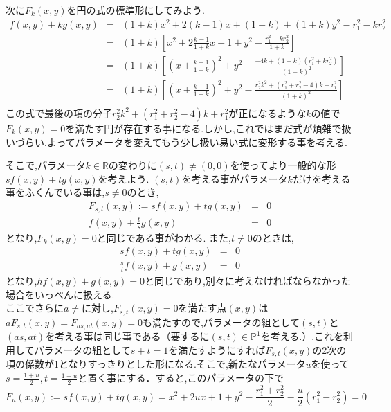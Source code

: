 \documentclass[a4j,12pt]{jarticle}
\numberwithin{equation}{section}
\newcommand{\R}{\mathbb R}
\begin{document}
次に$F_k(x,y)$を円の式の標準形にしてみよう.
\begin{eqnarray}
     f(x,y) + k g(x,y) &=& (1+k)x^2 + 2(k-1) x + (1+k) + (1+k)y^2  - r_1^2  - kr_2^2  \nonumber \\
      &=&  (1+k)\left[ x^2 + 2\frac{k-1}{1+k} x + 1 + y^2  -\frac{ r_1^2  + kr_2^2}{1+k} \right]\nonumber\\
      &=&  (1+k)\left[ \left(x + \frac{k-1}{1+k} \right)^2 + y^2  -\frac{ -4k +(1+k)(r_1^2  + kr_2^2)}{(1+k)^2} \right]\nonumber\\
      &=&  (1+k)\left[ \left(x + \frac{k-1}{1+k} \right)^2 + y^2  -\frac{ r_2^2k^2  + (r_1^2+r_2^2 -4)k + r_1^2}{(1+k)^2} \right]\nonumber\\
\end{eqnarray}
この式で最後の項の分子$r_2^2k^2  + (r_1^2+r_2^2 -4)k + r_1^2$が正になるような$k$の値で$F_k(x,y)=0$を満たす円が存在する事になる.しかし,これではまだ式が煩雑で扱いづらい.よってパラメータを変えてもう少し扱い易い式に変形する事を考える.\par
そこで,パラメータ$k\in \R$の変わりに$(s,t)\ne(0,0)$を使ってより一般的な形$s f(x,y)+t g(x,y)$を考えよう. $(s,t)$を考える事がパラメータ$k$だけを考える事をふくんでいる事は,$s\ne 0 $のとき,
\begin{eqnarray}
F_{s,t}(x,y) := s f(x,y) + t g(x,y) &=& 0 \nonumber\\
 f(x,y) + \frac{t}{s} g(x,y) &=& 0 \nonumber
\end{eqnarray}
となり,$F_k(x,y)=0$と同じである事がわかる. また,$t\ne0$のときは,
\begin{eqnarray}
s f(x,y) + t g(x,y) &=& 0 \nonumber\\
 \frac{s}{t}f(x,y) +  g(x,y) &=& 0 \nonumber
\end{eqnarray}
となり,$hf(x,y) + g(x,y) =0 $と同じであり,別々に考えなければならなかった場合をいっぺんに扱える.\\
ここでさらに$a\ne$に対し,$F_{s,t}(x,y)=0$を満たす点$(x,y)$は$aF_{s,t}(x,y)=F_{as,at}(x,y)=0$も満たすので,パラメータの組として$(s,t)$と$(as,at)$を考える事は同じ事である（要するに$(s,t)\in \mathbb{P}^1$を考える.）.これを利用してパラメータの組として$s+t=1$を満たすようにすれば$F_{s,t}(x,y)$の2次の項の係数が1となりすっきりとした形になる.そこで,新たなパラメータ$u$を使って$s=\frac{1+u}{2}, t=\frac{1-u}{2}$と置く事にする．すると,このパラメータの下で
\begin{equation}
F_u(x,y) := s f(x,y) + t g(x,y) = x^2 + 2u x + 1 + y^2  - \frac{r_1^2  +r_2^2}{2} -\frac{u}{2}(r_1^2  -r_2^2) = 0
\end{equation}
\end{document}
